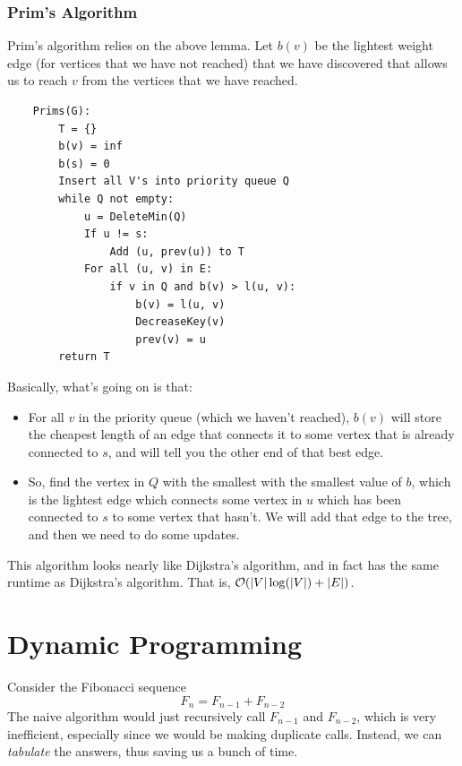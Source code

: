 \documentclass[letterpaper]{article}
\begin{document}
\subsubsection{Prim's Algorithm}
Prim's algorithm relies on the above lemma. Let $b(v)$ be the lightest weight edge (for vertices that we have not reached) that we have discovered that allows us to reach $v$ from the vertices that we have reached. 
\begin{verbatim}
    Prims(G):
        T = {}
        b(v) = inf 
        b(s) = 0
        Insert all V's into priority queue Q 
        while Q not empty:
            u = DeleteMin(Q)
            If u != s:
                Add (u, prev(u)) to T 
            For all (u, v) in E: 
                if v in Q and b(v) > l(u, v):
                    b(v) = l(u, v)
                    DecreaseKey(v)
                    prev(v) = u 
        return T 
\end{verbatim}
Basically, what's going on is that: 
\begin{itemize}
    \item For all $v$ in the priority queue (which we haven't reached), $b(v)$ will store the cheapest length of an edge that connects it to some vertex that is already connected to $s$, and  will tell you the other end of that best edge.
    \item So, find the vertex in $Q$ with the smallest with the smallest value of $b$, which is the lightest edge which connects some vertex in $u$ which has been connected to $s$ to some vertex that hasn't. We will add that edge to the tree, and then we need to do some updates. 
\end{itemize} 
This algorithm looks nearly like Dijkstra's algorithm, and in fact has the same runtime as Dijkstra's algorithm. That is, $\mathcal{O}(|V|\log(|V|) + |E|)$.





























\newpage 
\section{Dynamic Programming}
Consider the Fibonacci sequence 
\[F_n = F_{n - 1} + F_{n - 2}\]
The naive algorithm would just recursively call $F_{n - 1}$ and $F_{n - 2}$, which is very inefficient, especially since we would be making duplicate calls. Instead, we can \emph{tabulate} the answers, thus saving us a bunch of time. 
\end{document}
